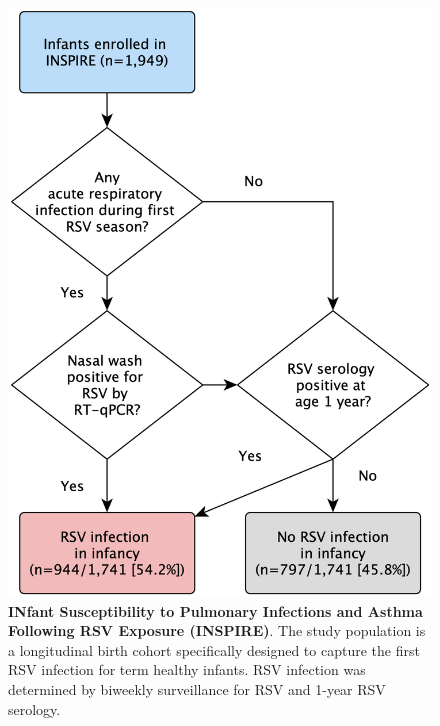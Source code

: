 \documentclass{article} %
\begin{document}
\begin{figure}[ht] \hspace*{0cm}  \begin{center}
    \includegraphics[scale=0.15]{f1_rsv_persist2022}
	\caption{\textbf{INfant Susceptibility to Pulmonary Infections and Asthma Following RSV Exposure (INSPIRE)}.
	 The study population is a longitudinal birth cohort specifically designed to capture the first RSV infection for term healthy infants. RSV infection was determined by biweekly surveillance for RSV and 1-year RSV serology.}

	\label{fig:1}
 \end{center} \end{figure}
 
\end{document}
